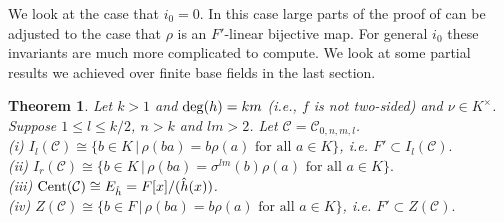 \documentclass[12pt]{amsart}
\theoremstyle{plain}
\newtheorem{theorem}{Theorem}[section]
\theoremstyle{definition}
\numberwithin{equation}{section}
\numberwithin{figure}{section}
\begin{document}
We look at the case that $i_0=0$. In this case large parts of the proof of \cite[Proposition 5.5]{NewS} can be adjusted to the case that $\rho$ is an $F'$-linear bijective map. For general $i_0$ these invariants are  much more complicated to compute. We look at some partial results we achieved over finite base fields in the last section.

\begin{theorem}\label{theorem 9IIa}
Let $k>1$ and ${\rm deg}(h)=km$  (i.e., $f$ is not two-sided) 
and $\nu\in K^\times$. Suppose $1\leq l\leq k/2$, $n>k$ and $lm>2$. 
Let $\mathcal{C}=\mathcal{C}_{0,n,m,l}$.
\\ (i) $I_l(\mathcal{C})\cong \lbrace b\in K \,|\, \rho(b a) = b\rho(a) \text{ for all } a\in K\rbrace$, i.e. $F'\subset I_l(\mathcal{C}).$
\\ (ii) $I_r(\mathcal{C}) \cong \lbrace b\in K\,|\, \rho(b a) = \sigma^{lm}(b)\rho(a) \text{ for all } a\in K\rbrace.$
\\ (iii) ${\rm Cent}(\mathcal{C})\cong E_{\hat{h}}=F[x]/ (\hat{h}(x) )$.
 \\ (iv) $Z(\mathcal{C})\cong \lbrace b\in F \,|\, \rho(b a) = b\rho(a)  \text{ for all } a\in K\rbrace$, i.e. $F'\subset Z(\mathcal{C}).$
\end{theorem}
\end{document}
